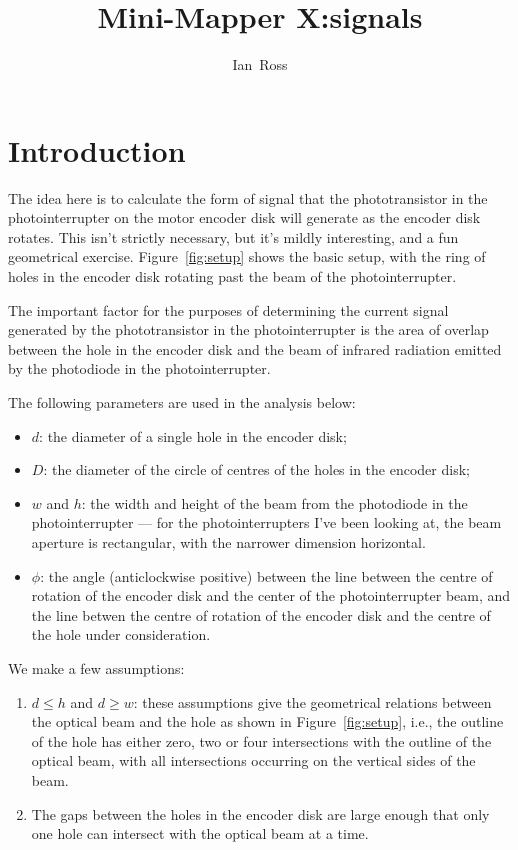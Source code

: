 \documentclass[a4paper,11pt,article]{memoir}
\title{Mini-Mapper X:\@Photoencoder signals}
\author{Ian~Ross}
\begin{document}
\maketitle

\section*{Introduction}

The idea here is to calculate the form of signal that the
phototransistor in the photointerrupter on the motor encoder disk will
generate as the encoder disk rotates. This isn't strictly necessary,
but it's mildly interesting, and a fun geometrical exercise.
Figure~\ref{fig:setup} shows the basic setup, with the ring of holes
in the encoder disk rotating past the beam of the photointerrupter.

The important factor for the purposes of determining the current
signal generated by the phototransistor in the photointerrupter is the
area of overlap between the hole in the encoder disk and the beam of
infrared radiation emitted by the photodiode in the photointerrupter.

The following parameters are used in the analysis below:
\begin{itemize}
  \item{$d$: the diameter of a single hole in the encoder disk;}
  \item{$D$: the diameter of the circle of centres of the holes in the
    encoder disk;}
  \item{$w$ and $h$: the width and height of the beam from the
    photodiode in the photointerrupter --- for the photointerrupters
    I've been looking at, the beam aperture is rectangular, with the
    narrower dimension horizontal.}
  \item{$\phi$: the angle (anticlockwise positive) between the line
    between the centre of rotation of the encoder disk and the center
    of the photointerrupter beam, and the line betwen the centre of
    rotation of the encoder disk and the centre of the hole under
    consideration.}
\end{itemize}

We make a few assumptions:
\begin{enumerate}
  \item{$d \leq h$ and $d \geq w$: these assumptions give the
    geometrical relations between the optical beam and the hole as
    shown in Figure~\ref{fig:setup}, i.e., the outline of the hole has
    either zero, two or four intersections with the outline of the
    optical beam, with all intersections occurring on the vertical
    sides of the beam.}
  \item{The gaps between the holes in the encoder disk are large
    enough that only one hole can intersect with the optical beam at a
    time.}
\end{enumerate}
\end{document}
